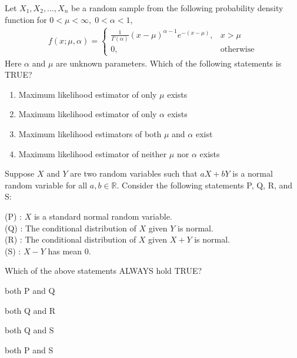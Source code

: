 \documentclass[journal]{IEEEtran}
\numberwithin{equation}{enumi}
\numberwithin{figure}{enumi}
\begin{document}
\begin{enumerate}
{\hfill{}

\item Let $X_1, X_2, \ldots, X_n$ be a random sample from the following probability density function for $0 < \mu < \infty, \; 0 < \alpha < 1$,
\begin{align*}
f(x; \mu, \alpha) = 
\begin{cases}
\frac{1}{\Gamma(\alpha)} (x - \mu)^{\alpha - 1} e^{-(x - \mu)}, & x > \mu \\
0, & \text{otherwise}
\end{cases}
\end{align*}
Here $\alpha$ and $\mu$ are unknown parameters. Which of the following statements is TRUE?

\begin{enumerate}

\item Maximum likelihood estimator of only $\mu$ exists
\item Maximum likelihood estimator of only $\alpha$ exists
\item Maximum likelihood estimators of both $\mu$ and $\alpha$ exist
\item Maximum likelihood estimator of neither $\mu$ nor $\alpha$ exists

\end{enumerate}

\hfill{}

\item Suppose $X$ and $Y$ are two random variables such that $aX + bY$ is a normal random variable for all $a, b \in \mathbb{R}$. Consider the following statements P, Q, R, and S:

(P) : $X$ is a standard normal random variable. \\
(Q) : The conditional distribution of $X$ given $Y$ is normal. \\
(R) : The conditional distribution of $X$ given $X+Y$ is normal. \\
(S) : $X - Y$ has mean $0$.

Which of the above statements ALWAYS hold TRUE?

\begin{enumerate}
\begin{multicols}{2}
\item both P and Q
\item both Q and R
\item both Q and S
\item both P and S
\end{multicols}
\end{enumerate}

}
\end{enumerate}
\end{document}
